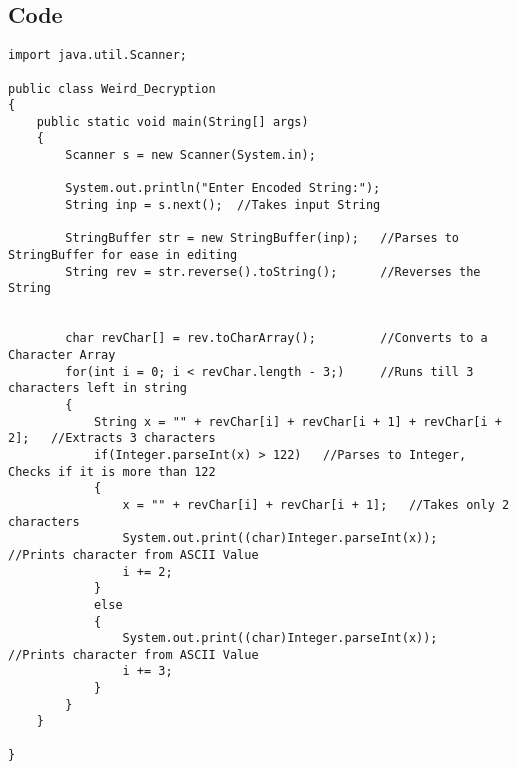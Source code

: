 \documentclass[ProgramminAssignment.tex]{subfiles}
\begin{document}
\subsection{Code}
\begin{lstlisting}
import java.util.Scanner;

public class Weird_Decryption
{
	public static void main(String[] args)
	{
		Scanner s = new Scanner(System.in);
		
		System.out.println("Enter Encoded String:");
		String inp = s.next();	//Takes input String
		
		StringBuffer str = new StringBuffer(inp);	//Parses to StringBuffer for ease in editing
		String rev = str.reverse().toString();		//Reverses the String
		
		
		char revChar[] = rev.toCharArray();			//Converts to a Character Array
		for(int i = 0; i < revChar.length - 3;)		//Runs till 3 characters left in string
		{
			String x = "" + revChar[i] + revChar[i + 1] + revChar[i + 2];	//Extracts 3 characters
			if(Integer.parseInt(x) > 122)	//Parses to Integer, Checks if it is more than 122
			{
				x = "" + revChar[i] + revChar[i + 1];	//Takes only 2 characters
				System.out.print((char)Integer.parseInt(x));	//Prints character from ASCII Value
				i += 2;
			}
			else
			{
				System.out.print((char)Integer.parseInt(x));	//Prints character from ASCII Value
				i += 3;
			}
		}
	}

}

\end{lstlisting}
\end{document}
